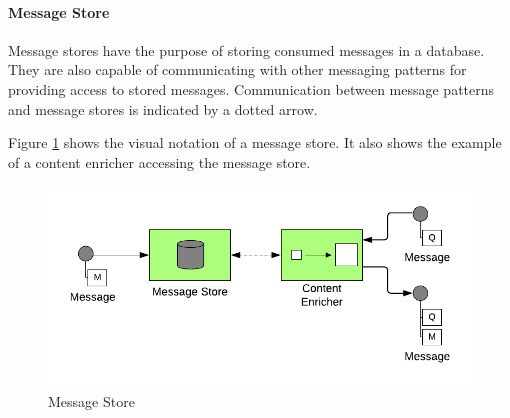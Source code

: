 \paragraph{Message Store}

Message stores have the purpose of storing consumed messages in a database. They are also capable of communicating with other messaging patterns for providing access to stored messages. Communication between message patterns and message stores is indicated by a dotted arrow.

Figure \ref{messaging:store} shows the visual notation of a message store. It also shows the example of a content enricher accessing the message store.

\begin{figure}[H]
    \centering
    \includegraphics[scale=0.6]{Diagrams/Messaging/12. Message Store.pdf}
    \caption{Message Store}
    \label{messaging:store}
\end{figure}

